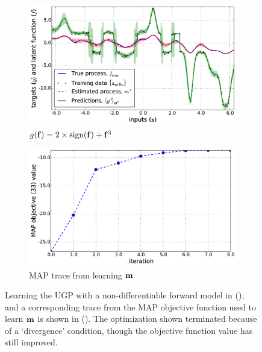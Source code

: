 \documentclass{article} %
\begin{document}
%
\begin{figure}[tb]
    \begin{subfigure}[b]{0.5\linewidth}
        \includegraphics[width=\linewidth]{fig/signdemo.png}
        \caption{$g\!\left({{\mathbf{f}}}\right) = 2\times\text{sign}\!\left({\mathbf{f}}\right)
            + \mathbf{f}^3$}
        \label{sub:sign}
    \end{subfigure}
    \begin{subfigure}[b]{0.5\linewidth}
        \includegraphics[width=\linewidth]{fig/trace.png}
        \caption{MAP trace from learning $\mathbf{m}$}
        \label{sub:mape}
        \vspace{0.5mm}
    \end{subfigure}

    \caption[]{Learning the UGP with a non-differentiable forward model in
        (), and a corresponding trace from the MAP objective
        function used to learn $\mathbf{m}$ is shown in (). The
        optimization shown terminated because of a `divergence' condition,
        though the objective function value has still improved.}

    \label{fig:learnex}
\end{figure}
\end{document}
